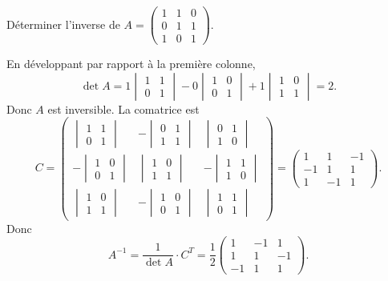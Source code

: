 \documentclass{book}
\begin{document}
\begin{Exemple}
Déterminer l'inverse de $ A = \begin{pmatrix}
1 & 1 & 0\\
0 & 1 & 1\\
1 & 0 & 1
\end{pmatrix}.$
\begin{Demonstration}
En développant par rapport à la première colonne,  
$$\det A = 1\begin{vmatrix}1&1\\0&1\end{vmatrix}
-0\begin{vmatrix}1&0\\0&1\end{vmatrix}+1\begin{vmatrix}1&0\\1&1\end{vmatrix}=2.$$ 
Donc $A$ est inversible. La comatrice est
$$C = \begin{pmatrix}
\begin{vmatrix}1&1\\0&1\end{vmatrix} & -\begin{vmatrix}0&1\\1&1\end{vmatrix} & \begin{vmatrix}0&1\\1&0\end{vmatrix}\\
-\begin{vmatrix}1&0\\0&1\end{vmatrix} & \begin{vmatrix}1&0\\1&1\end{vmatrix} & -\begin{vmatrix}1&1\\1&0\end{vmatrix}\\
\begin{vmatrix}1&0\\1&1\end{vmatrix} & -\begin{vmatrix}1&0\\0&1\end{vmatrix} & \begin{vmatrix}1&1\\0&1\end{vmatrix}
      \end{pmatrix}= \begin{pmatrix}
1 & 1 & -1\\
-1 & 1 & 1\\
1 & -1 & 1
      \end{pmatrix}.$$
Donc
$$A^{-1} = \frac{1}{\det A} \cdot C^T = \frac{1}{2}
\begin{pmatrix}
1 & -1 & 1\\
1 & 1 & -1\\
-1 & 1 & 1
\end{pmatrix}.
$$
\end{Demonstration}
\end{Exemple}
\end{document}
